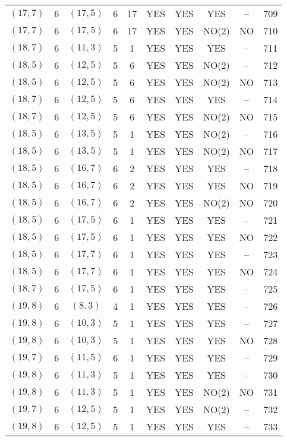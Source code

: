 \begin{longtable}{|c|c|c|c|c|c|c|c|c|c|}
$(17, 7)$ & 6 & $(17, 5)$ & 6 & 17 & YES & YES & YES & -- & 709\\
$(17, 7)$ & 6 & $(17, 5)$ & 6 & 17 & YES & YES & NO(2) & NO & 710\\
$(18, 7)$ & 6 & $(11, 3)$ & 5 & 1 & YES & YES & YES & -- & 711\\
$(18, 5)$ & 6 & $(12, 5)$ & 5 & 6 & YES & YES & NO(2) & -- & 712\\
$(18, 5)$ & 6 & $(12, 5)$ & 5 & 6 & YES & YES & NO(2) & NO & 713\\
$(18, 7)$ & 6 & $(12, 5)$ & 5 & 6 & YES & YES & YES & -- & 714\\
$(18, 7)$ & 6 & $(12, 5)$ & 5 & 6 & YES & YES & NO(2) & NO & 715\\
$(18, 5)$ & 6 & $(13, 5)$ & 5 & 1 & YES & YES & NO(2) & -- & 716\\
$(18, 5)$ & 6 & $(13, 5)$ & 5 & 1 & YES & YES & NO(2) & NO & 717\\
$(18, 5)$ & 6 & $(16, 7)$ & 6 & 2 & YES & YES & YES & -- & 718\\
$(18, 5)$ & 6 & $(16, 7)$ & 6 & 2 & YES & YES & YES & NO & 719\\
$(18, 5)$ & 6 & $(16, 7)$ & 6 & 2 & YES & YES & NO(2) & NO & 720\\
$(18, 5)$ & 6 & $(17, 5)$ & 6 & 1 & YES & YES & YES & -- & 721\\
$(18, 5)$ & 6 & $(17, 5)$ & 6 & 1 & YES & YES & YES & NO & 722\\
$(18, 5)$ & 6 & $(17, 7)$ & 6 & 1 & YES & YES & YES & -- & 723\\
$(18, 5)$ & 6 & $(17, 7)$ & 6 & 1 & YES & YES & YES & NO & 724\\
$(18, 7)$ & 6 & $(17, 5)$ & 6 & 1 & YES & YES & YES & -- & 725\\
$(19, 8)$ & 6 & $(8, 3)$ & 4 & 1 & YES & YES & YES & -- & 726\\
$(19, 8)$ & 6 & $(10, 3)$ & 5 & 1 & YES & YES & YES & -- & 727\\
$(19, 8)$ & 6 & $(10, 3)$ & 5 & 1 & YES & YES & YES & NO & 728\\
$(19, 7)$ & 6 & $(11, 5)$ & 6 & 1 & YES & YES & YES & -- & 729\\
$(19, 8)$ & 6 & $(11, 3)$ & 5 & 1 & YES & YES & YES & -- & 730\\
$(19, 8)$ & 6 & $(11, 3)$ & 5 & 1 & YES & YES & NO(2) & NO & 731\\
$(19, 7)$ & 6 & $(12, 5)$ & 5 & 1 & YES & YES & NO(2) & -- & 732\\
$(19, 8)$ & 6 & $(12, 5)$ & 5 & 1 & YES & YES & YES & -- & 733\\

\end{longtable}
